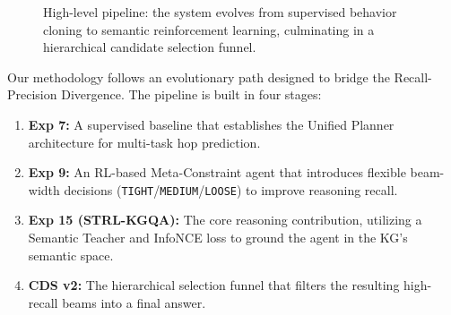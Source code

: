 \documentclass[11pt,a4paper]{article}
\newcommand{\STRL}{\textsc{STRL-KGQA}}
\newcommand{\CDS}{\textsc{CDS}}
\begin{document}
\begin{figure}[h]
  \centering
  \caption{High-level pipeline: the system evolves from supervised behavior cloning to semantic reinforcement learning, culminating in a hierarchical candidate selection funnel.}
  \label{fig:pipeline-overview}
\end{figure}
Our methodology follows an evolutionary path designed to bridge the
Recall-Precision Divergence. The pipeline is built in four stages:
\begin{enumerate}
    \item \textbf{Exp 7:} A supervised baseline that establishes the
          Unified Planner architecture for multi-task hop prediction.
    \item \textbf{Exp 9:} An RL-based Meta-Constraint agent that introduces
          flexible beam-width decisions (\texttt{TIGHT}/\texttt{MEDIUM}/\texttt{LOOSE})
          to improve reasoning recall.
    \item \textbf{Exp 15 (\STRL{}):} The core reasoning contribution, utilizing
          a Semantic Teacher and InfoNCE loss to ground the agent in the
          KG's semantic space.
    \item \textbf{\CDS{} v2:} The hierarchical selection funnel that
          filters the resulting high-recall beams into a final answer.
\end{enumerate}
\end{document}
